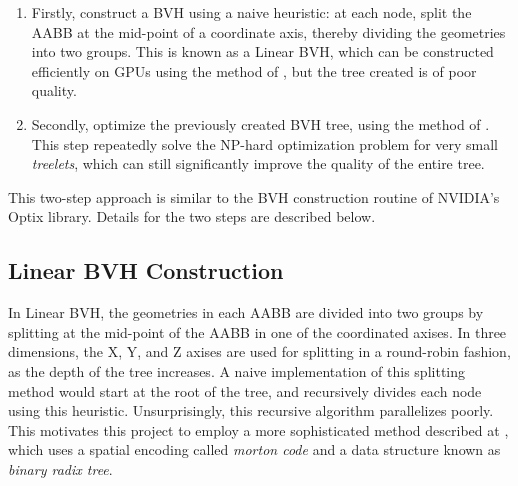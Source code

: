 \begin{enumerate}
    \item Firstly, construct a BVH using a naive heuristic: at each node, split the AABB at the mid-point of a coordinate axis, thereby dividing the geometries into two groups. This is known as a Linear BVH, which can be constructed efficiently on GPUs using the method of \cite{bvh_build}, but the tree created is of poor quality.
    \item Secondly, optimize the previously created BVH tree, using the method of \cite{bvh_optimize}. This step repeatedly solve the NP-hard optimization problem for very small \textit{treelets}, which can still significantly improve the quality of the entire tree.
\end{enumerate}
This two-step approach is similar to the BVH construction routine of NVIDIA's Optix library. Details for the two steps are described below.

\subsection{Linear BVH Construction}
In Linear BVH, the geometries in each AABB are divided into two groups by splitting at the mid-point of the AABB in one of the coordinated axises. In three dimensions, the X, Y, and Z axises are used for splitting in a round-robin fashion, as the depth of the tree increases. A naive implementation of this splitting method would start at the root of the tree, and recursively divides each node using this heuristic. Unsurprisingly, this recursive algorithm parallelizes poorly. This motivates this project to employ a more sophisticated method described at \cite{bvh_build}, which uses a spatial encoding called \textit{morton code} and a data structure known as \textit{binary radix tree}.

